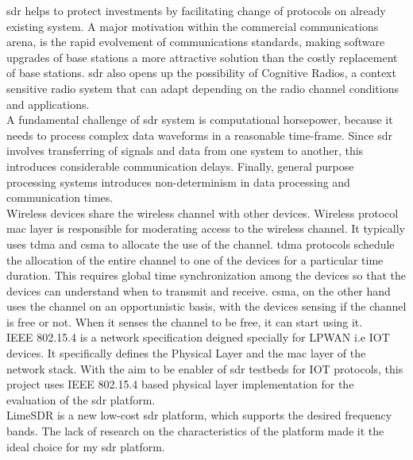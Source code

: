 \ac{sdr} helps to protect investments by facilitating change of protocols on already existing system. A major motivation within the commercial communications arena, is the rapid evolvement of communications standards, making software upgrades of base stations a more attractive solution than the costly replacement of base stations\cite{ulversoy_software_2010}. \ac{sdr} also opens up the possibility of Cognitive Radios, a context sensitive radio system that can adapt depending on the radio channel conditions and applications. \\

A fundamental challenge of \ac{sdr} system is computational horsepower, because it needs to process complex data waveforms in a reasonable time-frame. Since \ac{sdr} involves transferring of signals and data from one system to another, this introduces considerable communication delays. Finally, general purpose processing systems introduces non-determinism in data processing and communication times.\\



Wireless devices share the wireless channel with other devices. Wireless protocol \ac{mac} layer is responsible for moderating access to the wireless channel. It typically uses \ac{tdma} and \ac{csma} to allocate the use of the channel. \ac{tdma} protocols schedule the allocation of the entire channel to one of the devices for a particular time duration. This requires global time synchronization among the devices so that the devices can understand when to transmit and receive. \ac{csma}, on the other hand uses the channel on an opportunistic basis, with the devices sensing if the channel is free or not. When it senses the channel to be free, it can start using it.\\

IEEE 802.15.4 \cite{noauthor_ieee_nodate} is a network specification deigned specially for \ac{LPWAN} i.e \ac{IOT} devices.
It specifically defines the Physical Layer and the \ac{mac} layer of the network stack.
With the aim to be enabler of \ac{sdr} testbeds for \ac{IOT} protocols, this project uses IEEE 802.15.4 based physical layer implementation for the evaluation of the \ac{sdr} platform. \\

LimeSDR \cite{noauthor_limesdr_nodate} is a new low-cost \ac{sdr} platform, which supports the desired frequency bands.
The lack of research on the characteristics of the platform made it the ideal choice for my \ac{sdr} platform. 


